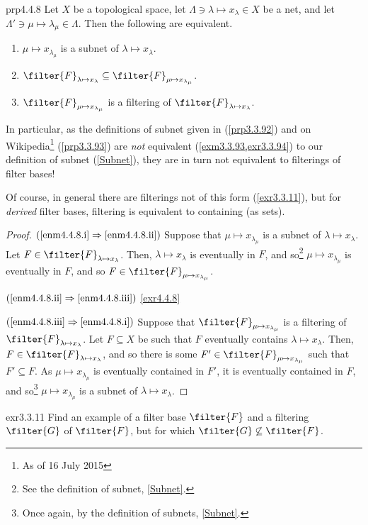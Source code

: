 \begin{prp}{}{prp4.4.8}
Let $X$ be a topological space, let $\Lambda \ni \lambda \mapsto x_\lambda \in X$ be a net, and let $\Lambda '\ni \mu \mapsto \lambda _\mu \in \Lambda$.  Then the following are equivalent.
\begin{enumerate}
\item \label{enm4.4.8.i}$\mu \mapsto x_{\lambda _\mu}$ is a subnet of $\lambda \mapsto x_\lambda$.
\item \label{enm4.4.8.ii}$\filter{F}_{\lambda \mapsto x_\lambda}\subseteq \filter{F}_{\mu \mapsto x_{\lambda _\mu}}$.
\item \label{enm4.4.8.iii}$\filter{F}_{\mu \mapsto x_{\lambda _\mu}}$ is a filtering of $\filter{F}_{\lambda \mapsto x_\lambda}$.
\end{enumerate}
\begin{rmk}
In particular, as the definitions of subnet given in \cite{Kelley} (\cref{prp3.3.92}) and on Wikipedia\footnote{As of 16 July 2015} (\cref{prp3.3.93}) are \emph{not} equivalent (\cref{exm3.3.93,exr3.3.94}) to our definition of subnet (\cref{Subnet}), they are in turn not equivalent to filterings of filter bases!
\end{rmk}
\begin{rmk}
Of course, in general there are filterings not of this form (\cref{exr3.3.11}), but for \emph{derived} filter bases, filtering is equivalent to containing (as sets).
\end{rmk}
\begin{proof}
$(\cref{enm4.4.8.i}\Rightarrow \cref{enm4.4.8.ii})$ Suppose that $\mu \mapsto x_{\lambda _\mu}$ is a subnet of $\lambda \mapsto x_\lambda$.  Let $F\in \filter{F}_{\lambda \mapsto x_\lambda}$.  Then, $\lambda \mapsto x_\lambda$ is eventually in $F$, and so\footnote{See the definition of subnet, \cref{Subnet}.} $\mu \mapsto x_{\lambda _\mu}$ is eventually in $F$, and so $F\in \filter{F}_{\mu \mapsto x_{\lambda _\mu}}$.

\blankline
\noindent
$(\cref{enm4.4.8.ii}\Rightarrow \cref{enm4.4.8.iii})$ \cref{exr4.4.8}

\blankline
\noindent
$(\cref{enm4.4.8.iii}\Rightarrow \cref{enm4.4.8.i})$
Suppose that $\filter{F}_{\mu \mapsto x_{\lambda _\mu}}$ is a filtering of $\filter{F}_{\lambda \mapsto x_\lambda}$.  Let $F\subseteq X$ be such that $F$ eventually contains $\lambda \mapsto x_\lambda$.  Then, $F\in \filter{F}_{\lambda \mapsto x_\lambda}$, and so there is some $F'\in \filter{F}_{\mu \mapsto x_{\lambda _\mu}}$ such that $F'\subseteq F$.  As $\mu \mapsto x_{\lambda _\mu}$ is eventually contained in $F'$, it is eventually contained in $F$, and so\footnote{Once again, by the definition of subnets, \cref{Subnet}.} $\mu \mapsto x_{\lambda _\mu}$ is a subnet of $\lambda \mapsto x_\lambda$.
\end{proof}
\end{prp}
\begin{exr}{}{exr3.3.11}
Find an example of a filter base $\filter{F}$ and a filtering $\filter{G}$ of $\filter{F}$, but for which $\filter{G}\not \subseteq \filter{F}$.
\end{exr}

